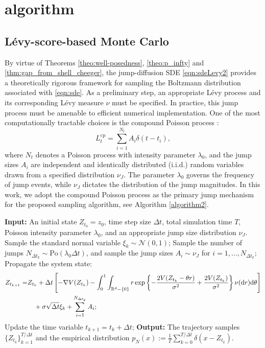 \section{algorithm}
\subsection{L\'{e}vy-score-based Monte Carlo}

By virtue of Theorems \ref{theo:well-posedness}, \ref{theo:p_infty} and \ref{thm:gap_from_shell_cheeger}, the jump-diffusion SDE \eqref{eqn:sdeLevy2} provides a theoretically rigorous framework for sampling the Boltzmann distribution associated with \eqref{eqn:sde}. As a preliminary step, an appropriate L\'{e}vy process and its corresponding L\'{e}vy measure $\nu$ must be specified. In practice, this jump process must be amenable to efficient numerical implementation. One of the most computationally tractable choices is the compound Poisson process \cite{applebaum2009levy}:
\begin{equation}
    L^\mathrm{cp}_t=\sum_{i=1}^{N_t}A_i\delta(t-t_i),
\end{equation}
where $N_t$ denotes a Poisson process with intensity parameter $\lambda_0$, and the jump sizes $A_i$ are independent and identically distributed (i.i.d.) random variables drawn from a specified distribution $\nu_J$. The parameter $\lambda_0$ governs the frequency of jump events, while $\nu_J$ dictates the distribution of the jump magnitudes. In this work, we adopt the compound Poisson process as the primary jump mechanism for the proposed sampling algorithm, see Algorithm \ref{algorithm2}.

\begin{algorithm}
\caption{L\'{e}vy-score-based Monte Carlo sampling Boltzmann distribution}
\label{algorithm2}
\begin{algorithmic}[1]
    \STATE \textbf{Input:} An initial state $Z_{t_0}=z_0$, time step size $\Delta t$, total simulation time $T$, Poisson intensity parameter $\lambda_0$, and an appropriate jump size distribution $\nu_J$.
        \STATE Sample the standard normal variable $\xi_k\sim \mathcal{N}(0,1)$;
        \STATE Sample the number of jumps $N_{\Delta t_k}\sim \mathrm{Po}(\lambda_0 \Delta t)$, and sample the jump sizes $A_i\sim\nu_J$ for $i=1,\dots,N_{\Delta t_k}$;
        \STATE Propagate the system state: 
        \begin{align*}
            Z_{t_{k+1}}=& Z_{t_{k}}+ \Delta t \left[ -\nabla V(Z_{t_{k}}) -\int_0^1\int_{\mathbb{R}^d-\{0\}} r\exp\left\{-\frac{2V(Z_{t_{k}}- \theta r)}{\sigma^2} + \frac{2V(Z_{t_{k}})}{\sigma^2}\right\} \nu(\mathrm{d} r)\mathrm{d}\theta \right] \\
            & \quad + \sigma\sqrt{\Delta t}\xi_k + \sum_{i=1}^{N_{\Delta t_k}}A_i;
        \end{align*}
        \STATE Update the time variable $t_{k+1}=t_{k}+\Delta t$;
    \ENDFOR
    \STATE \textbf{Output:} The trajectory samples $\{Z_{t_k}\}_{k=1}^{T/\Delta t}$ and the empirical distribution $p_N(x):=\frac{1}{T}\sum_{k=0}^{T/\Delta t}\delta(x-Z_{t_k})$.
\end{algorithmic}
\end{algorithm}

